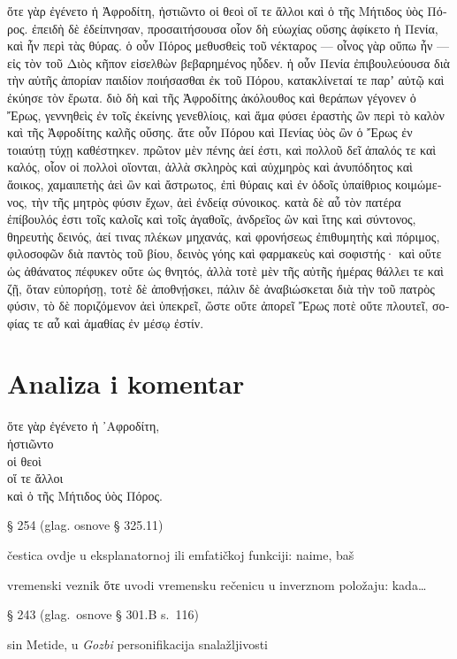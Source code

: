 {\large

\begin{greek}

\noindent ὅτε γὰρ ἐγένετο ἡ Ἀφροδίτη, ἡστιῶντο οἱ θεοὶ οἵ τε ἄλλοι καὶ ὁ τῆς Μήτιδος ὑὸς Πόρος. ἐπειδὴ δὲ ἐδείπνησαν, προσαιτήσουσα οἷον δὴ εὐωχίας οὔσης ἀφίκετο ἡ Πενία, καὶ ἦν περὶ τὰς θύρας. ὁ οὖν Πόρος μεθυσθεὶς τοῦ νέκταρος — οἶνος γὰρ οὔπω ἦν — εἰς τὸν τοῦ Διὸς κῆπον εἰσελθὼν βεβαρημένος ηὗδεν. ἡ οὖν Πενία ἐπιβουλεύουσα διὰ τὴν αὑτῆς ἀπορίαν παιδίον ποιήσασθαι ἐκ τοῦ Πόρου, κατακλίνεταί τε παρʼ αὐτῷ καὶ ἐκύησε τὸν ἔρωτα. διὸ δὴ καὶ τῆς Ἀφροδίτης ἀκόλουθος καὶ θεράπων γέγονεν ὁ Ἔρως, γεννηθεὶς ἐν τοῖς ἐκείνης γενεθλίοις, καὶ ἅμα φύσει ἐραστὴς ὢν περὶ τὸ καλὸν καὶ τῆς Ἀφροδίτης καλῆς οὔσης. ἅτε οὖν Πόρου καὶ Πενίας ὑὸς ὢν ὁ Ἔρως ἐν τοιαύτῃ τύχῃ καθέστηκεν. πρῶτον μὲν πένης ἀεί ἐστι, καὶ πολλοῦ δεῖ ἁπαλός τε καὶ καλός, οἷον οἱ πολλοὶ οἴονται, ἀλλὰ σκληρὸς καὶ αὐχμηρὸς καὶ ἀνυπόδητος καὶ ἄοικος, χαμαιπετὴς ἀεὶ ὢν καὶ ἄστρωτος, ἐπὶ θύραις καὶ ἐν ὁδοῖς ὑπαίθριος κοιμώμενος, τὴν τῆς μητρὸς φύσιν ἔχων, ἀεὶ ἐνδείᾳ σύνοικος. κατὰ δὲ αὖ τὸν πατέρα ἐπίβουλός ἐστι τοῖς καλοῖς καὶ τοῖς ἀγαθοῖς, ἀνδρεῖος ὢν καὶ ἴτης καὶ σύντονος, θηρευτὴς δεινός, ἀεί τινας πλέκων μηχανάς, καὶ φρονήσεως ἐπιθυμητὴς καὶ πόριμος, φιλοσοφῶν διὰ παντὸς τοῦ βίου, δεινὸς γόης καὶ φαρμακεὺς καὶ σοφιστής· καὶ οὔτε ὡς ἀθάνατος πέφυκεν οὔτε ὡς θνητός, ἀλλὰ τοτὲ μὲν τῆς αὐτῆς ἡμέρας θάλλει τε καὶ ζῇ, ὅταν εὐπορήσῃ, τοτὲ δὲ ἀποθνῄσκει, πάλιν δὲ ἀναβιώσκεται διὰ τὴν τοῦ πατρὸς φύσιν, τὸ δὲ ποριζόμενον ἀεὶ ὑπεκρεῖ, ὥστε οὔτε ἀπορεῖ Ἔρως ποτὲ οὔτε πλουτεῖ, σοφίας τε αὖ καὶ ἀμαθίας ἐν μέσῳ ἐστίν.

\end{greek}

}


\section*{Analiza i komentar}


{\large
\begin{greek}
\noindent ὅτε γὰρ ἐγένετο ἡ ᾿Αφροδίτη, \\
ἡστιῶντο \\
οἱ θεοὶ \\
οἵ τε ἄλλοι \\
καὶ ὁ τῆς Μήτιδος ὑὸς Πόρος.\\

\end{greek}
}

\begin{description}[noitemsep]
\item[ἐγένετο] § 254 (glag. osnove § 325.11)
\item[γὰρ] čestica ovdje u eksplanatornoj ili emfatičkoj funkciji: naime, baš
\item[ὅτε γὰρ ἐγένετο] vremenski veznik ὅτε uvodi vremensku rečenicu u inverznom položaju: kada…
\item[ἡστιῶντο] § 243 (glag.\ osnove § 301.B s.~116)
\item[Πόρος] sin Metide, u \textit{Gozbi} personifikacija snalažljivosti

\end{description}

